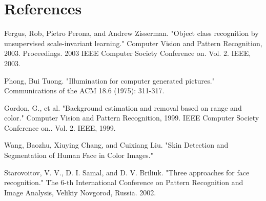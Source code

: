 \documentclass[final,3p,times,twocolumn,sort&compress]{elsarticle}
\begin{document}
\section*{References}

\begin{thebibliography}{9}

Fergus, Rob, Pietro Perona, and Andrew Zisserman. "Object class recognition by unsupervised scale-invariant learning." Computer Vision and Pattern Recognition, 2003. Proceedings. 2003 IEEE Computer Society Conference on. Vol. 2. IEEE, 2003.

Phong, Bui Tuong. "Illumination for computer generated pictures." Communications of the ACM 18.6 (1975): 311-317.

Gordon, G., et al. "Background estimation and removal based on range and color." Computer Vision and Pattern Recognition, 1999. IEEE Computer Society Conference on.. Vol. 2. IEEE, 1999.

 Wang, Baozhu, Xiuying Chang, and Cuixiang Liu. "Skin Detection and Segmentation of Human Face in Color Images."

Starovoitov, V. V., D. I. Samal, and D. V. Briliuk. "Three approaches for face recognition." The 6-th International Conference on Pattern Recognition and Image Analysis, Velikiy Novgorod, Russia. 2002.

\end{thebibliography}
\end{document}
